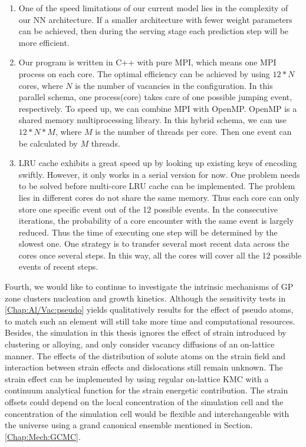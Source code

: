\begin{enumerate}

  \item One of the speed limitations of our current model lies in the complexity of our \ac{NN} architecture. If a smaller architecture with fewer weight parameters can be achieved, then during the serving stage each prediction step will be more efficient.

  \item Our program is written in C++ with pure \ac{MPI}, which means one \ac{MPI} process on each core. The optimal efficiency can be achieved by using $12*N$ cores, where $N$ is the number of vacancies in the configuration. In this parallel schema, one process(core) takes care of one possible jumping event, respectively. To speed up, we can combine \ac{MPI} with OpenMP. OpenMP is a shared memory multiprocessing library. In this hybrid schema, we can use $12*N*M$, where $M$ is the number of threads per core. Then one event can be calculated by $M$ threads.

  \item \ac{LRU} cache exhibits a great speed up by looking up existing keys of encoding swiftly. However, it only works in a serial version for now. One problem needs to be solved before multi-core \ac{LRU} cache can be implemented. The problem lies in different cores do not share the same memory. Thus each core can only store one specific event out of the 12 possible events. In the consecutive iterations, the probability of a core encounter with the same event is largely reduced. Thus the time of executing one step will be determined by the slowest one. One strategy is to transfer several most recent data across the cores once several steps. In this way, all the cores will cover all the 12 possible events of recent steps.

\end{enumerate}

Fourth, we would like to continue to investigate the intrinsic mechanisms of GP zone clusters nucleation and growth kinetics. Although the sensitivity tests in \ref{Chap:Al/Vac:pseudo} yields qualitatively results for the effect of pseudo atoms, to match such an element will still take more time and computational resources. Besides, the simulation in this thesis ignores the effect of strain introduced by clustering or alloying, and only consider vacancy diffusions of an on-lattice manner. The effects of the distribution of solute atoms on the strain field and interaction between strain effects and dislocations still remain unknown. The strain effect can be implemented by using regular on-lattice \ac{KMC} with a continuum analytical function for the strain energetic contribution. The strain offsets could depend on the local concentration of the simulation cell and the concentration of the simulation cell would be flexible and interchangeable with the universe using a grand canonical ensemble mentioned in Section. \ref{Chap:Mech:GCMC}.

